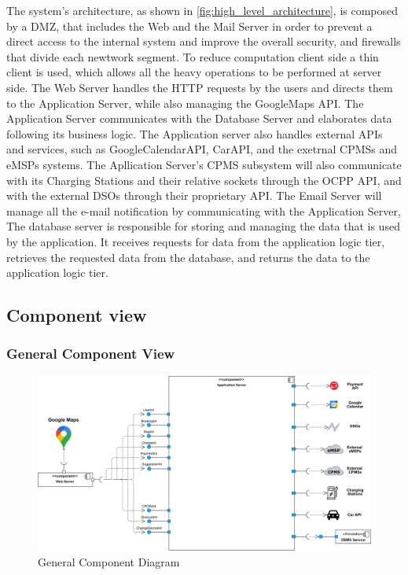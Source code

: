 \documentclass[table, 12pt]{article}
\begin{document}
The system's architecture, as shown in \ref{fig:high_level_architecture}, is composed by a DMZ, that includes the Web and the Mail Server in order to prevent a direct access to the internal system and improve the overall security, and firewalls that divide each newtwork segment.
To reduce computation client side a thin client is used, which allows all the heavy operations to be performed at server side. The Web Server handles the HTTP requests by the users and directs them to the Application Server, while also managing the GoogleMaps API. 
The Application Server communicates with the Database Server and elaborates data following its business logic. The Application server also handles external APIs and services, such as GoogleCalendarAPI, CarAPI, and the exetrnal CPMSs and eMSPs systems.
The Apllication Server's CPMS subsystem will also communicate with its Charging Stations and their relative sockets through the OCPP API, and with the external DSOs through their proprietary API.
The Email Server will manage all the e-mail notification by communicating with the Application Server, The database server is responsible for storing and managing the data that is used by the application. It receives requests for data from the application logic tier, retrieves the requested data from the database, and returns the data to the application logic tier.

\subsection{Component view}
\subsubsection*{General Component View}
\begin{center}
    \begin{figure}[H]
        \includegraphics[scale=0.65, center]{assets/general_component_diagram.png}
        \caption{General Component Diagram}
        \label{fig: general_component_view}
    \end{figure}
\end{center}
\end{document}

